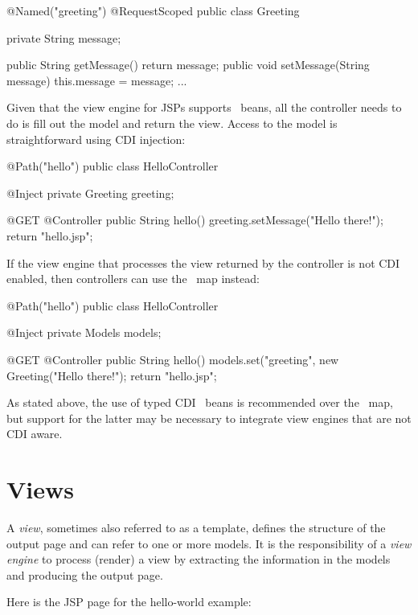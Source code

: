 \begin{listing}{1}
@Named("greeting")
@RequestScoped
public class Greeting {

	private String message;
	
	public String getMessage() { return message; }
	public void setMessage(String message) { this.message = message; }
	...
}
\end{listing}

Given that the view engine for JSPs supports \Named\ beans, all the controller
needs to do is fill out the model and return the view. Access to the model
is straightforward using CDI injection:

\begin{listing}{1}
@Path("hello")
public class HelloController {

	@Inject
	private Greeting greeting;

    @GET
    @Controller
    public String hello() {
        greeting.setMessage("Hello there!");
        return "hello.jsp";
    }
}
\end{listing}

If the view engine that processes the view returned by the controller is not CDI 
enabled, then controllers can use the \Models\ map instead:

\begin{listing}{1}
@Path("hello")
public class HelloController {

	@Inject
	private Models models;

    @GET
    @Controller
    public String hello() {
        models.set("greeting", new Greeting("Hello there!");
        return "hello.jsp";
    }
}
\end{listing}

As stated above, the use of typed CDI \Named\ beans is recommended over the \Models\ map,
but support for the latter may be necessary to integrate view engines that are not
CDI aware.

\section{Views}
\label{views}

A {\em view}, sometimes also referred to as a template, defines the structure of the output
page and can refer to one or more models. It is the responsibility of a {\em view engine}
to process (render) a view by extracting the information in the models and producing the
output page. 

Here is the JSP page for the hello-world example:

